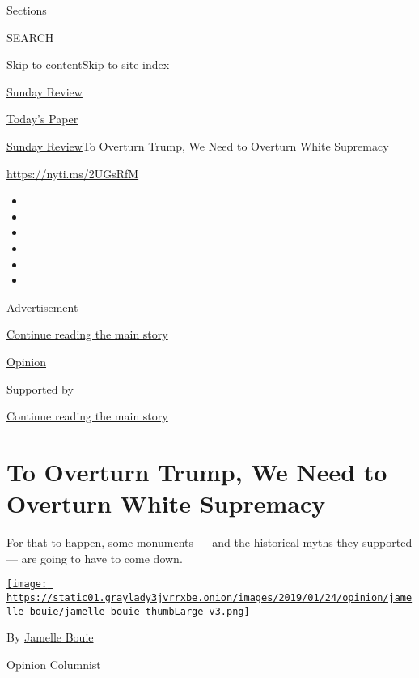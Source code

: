 Sections

SEARCH

\protect\hyperlink{site-content}{Skip to
content}\protect\hyperlink{site-index}{Skip to site index}

\href{https://www.nytimes3xbfgragh.onion/section/opinion/sunday}{Sunday
Review}

\href{https://myaccount.nytimes3xbfgragh.onion/auth/login?response_type=cookie\&client_id=vi}{}

\href{https://www.nytimes3xbfgragh.onion/section/todayspaper}{Today's
Paper}

\href{/section/opinion/sunday}{Sunday Review}\textbar{}To Overturn
Trump, We Need to Overturn White Supremacy

\href{https://nyti.ms/2UGsRfM}{https://nyti.ms/2UGsRfM}

\begin{itemize}
\item
\item
\item
\item
\item
\item
\end{itemize}

Advertisement

\protect\hyperlink{after-top}{Continue reading the main story}

\href{/section/opinion}{Opinion}

Supported by

\protect\hyperlink{after-sponsor}{Continue reading the main story}

\hypertarget{to-overturn-trump-we-need-to-overturn-white-supremacy}{%
\section{To Overturn Trump, We Need to Overturn White
Supremacy}\label{to-overturn-trump-we-need-to-overturn-white-supremacy}}

For that to happen, some monuments --- and the historical myths they
supported --- are going to have to come down.

\href{https://www.nytimes3xbfgragh.onion/column/jamelle-bouie}{\texttt{[image: https://static01.graylady3jvrrxbe.onion/images/2019/01/24/opinion/jamelle-bouie/jamelle-bouie-thumbLarge-v3.png]}}

By
\href{https://www.nytimes3xbfgragh.onion/column/jamelle-bouie}{Jamelle
Bouie}

Opinion Columnist

